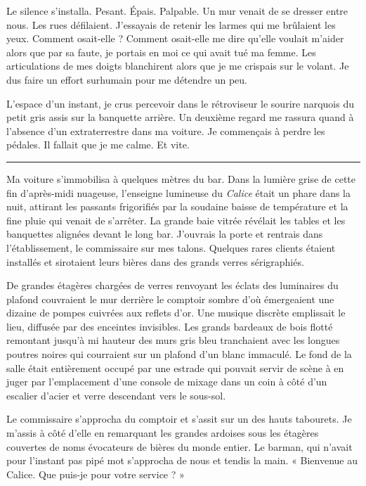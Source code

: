 Le silence s'installa. Pesant. Épais. Palpable. Un mur venait de se dresser entre nous. Les rues défilaient. J'essayais 
de retenir les larmes qui me brûlaient les yeux. Comment osait-elle ? Comment osait-elle me dire qu'elle voulait m'aider 
alors que par sa faute, je portais en moi ce qui avait tué ma femme. Les articulations de mes doigts blanchirent alors 
que je me crispais sur le volant. Je dus faire un effort surhumain pour me détendre un peu.

L'espace d'un instant, je crus percevoir dans le rétroviseur le sourire narquois du petit gris assis sur la banquette 
arrière. Un deuxième regard me rassura quand à l'absence d'un extraterrestre dans ma voiture. Je commençais à perdre 
les pédales. Il fallait que je me calme. Et vite.

\fancybreak{$* * *$}

Ma voiture s'immobilisa à quelques mètres du bar. Dans la lumière grise de cette fin d'après-midi nuageuse, l'enseigne 
lumineuse du \emph{Calice} était un phare dans la nuit, attirant les passants frigorifiés par la soudaine baisse de 
température et la fine pluie qui venait de s'arrêter. La grande baie vitrée révélait les tables et les banquettes 
alignées devant le long bar. J'ouvrais la porte et rentrais dans l'établissement, le commissaire sur mes talons. 
Quelques rares clients étaient installés et sirotaient leurs bières dans des grands verres sérigraphiés.

De grandes étagères chargées de verres renvoyant les éclats des luminaires du plafond couvraient le mur derrière le 
comptoir sombre d'où émergeaient une dizaine de pompes cuivrées aux reflets d'or. Une musique discrète emplissait le 
lieu, diffusée par des enceintes invisibles. Les grands bardeaux de bois flotté remontant jusqu'à mi hauteur des murs 
gris bleu tranchaient avec les longues poutres noires qui courraient sur un plafond d'un blanc immaculé. Le fond de la 
salle était entièrement occupé par une estrade qui pouvait servir de scène à en juger par l'emplacement d'une console 
de mixage dans un coin à côté d'un escalier d'acier et verre descendant vers le sous-sol.

Le commissaire s'approcha du comptoir et s'assit sur un des hauts tabourets. Je m'assis à côté d'elle en remarquant 
les grandes ardoises sous les étagères couvertes de noms évocateurs de bières du monde entier. Le barman, qui 
n'avait pour l'instant pas pipé mot s'approcha de nous et tendis la main. « Bienvenue au Calice. Que puis-je pour votre 
service ? »

